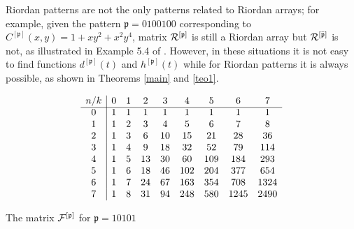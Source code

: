 \begin{rem}
 Riordan patterns are not the only patterns
related to Riordan arrays; for example, given the pattern $\mathfrak{p}=0100100$
corresponding to $C^{[\mathfrak{p}]}(x,y)=1+xy^2+x^2y^4$, matrix
${\cal{R}^{[\mathfrak{p}]}}$ is still a Riordan array but ${\cal{R}^{[\bar{\mathfrak{p}}]}}$
is not, as illustrated in Example 5.4 of \cite{BMS07a}. However, in these situations it is not
easy to find functions $d^{[\mathfrak{p}]}(t)$ and $h^{[\mathfrak{p}]}(t)$ while for
Riordan patterns it is always possible, as shown in Theorems \ref{main} and \ref{teo1}.
\end{rem}

\begin{table}[htb]
$$
\begin{array}{c|cccccccc}
n/k  & 0 & 1 & 2 & 3 & 4 &5 &6 &7  \\ \cline{1-9}
0 & 1 & 1 & 1 & 1& 1 &  1 & 1 & 1\\
1 & 1 & 2 & 3 & 4 & 5 & 6 & 7 & 8 \\
2 & 1 & 3 & 6 & 10 & 15 & 21 & 28 & 36\\
3 & 1 & 4 & 9 & 18 & 32 & 52& 79 & 114\\
4 & 1& 5 & 13 & 30 & 60 & 109& 184 & 293\\
5 & 1 & 6 & 18 & 46 & 102 & 204 & 377 & 654\\
6 & 1 & 7 & 24 & 67 & 163 & 354& 708 & 1324\\
7 & 1 & 8 & 31 & 94 & 248 &580& 1245 &2490\\
\end{array}
$$
\caption{\label{Fprimo}The  matrix  ${\cal{F}^{[\mathfrak{p}]}}$ for $\mathfrak{p}=10101$}
\end{table}

